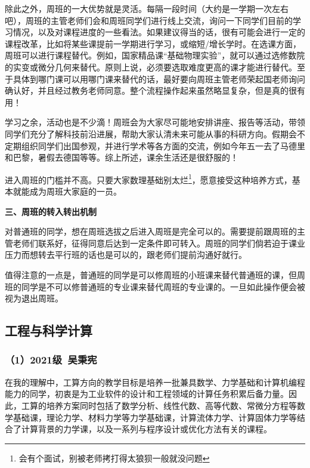 \documentclass[11pt,oneside]{book}
\begin{document}
\vspace{10pt}

除此之外，周班的一大优势就是灵活。每隔一段时间（大约是一学期一次左右吧），周班的主管老师们会和周班同学们进行线上交流，询问一下同学们目前的学习情况，以及对课程进度的一些看法。如果建议得当的话，很有可能会进行一定的课程改革，比如将某些课提前一学期进行学习，或缩短/增长学时。在选课方面，周班可以进行课程替代。例如，国家精品课“基础物理实验”，就可以通过选修数院的实变或微分几何来替代。原则上说，必须要选取难度更高的课才能进行替代。至于具体到哪门课可以用哪门课来替代的话，最好要向周班主管老师荣起国老师询问确认好，并且经过教务老师同意。整个流程操作起来虽然略显复杂，但是真的很有用！

\vspace{10pt}

学习之余，活动也是不少滴！周班会为大家尽可能地安排讲座、报告等活动，带领同学们充分了解科技前沿进展，帮助大家认清未来可能从事的科研方向。假期会不定期组织同学们出国参观，并进行学术等各方面的交流，例如今年五一去了马德里和巴黎，暑假去德国等等。综上所述，课余生活还是很舒服的！

\vspace{10pt}

进入周班的门槛并不高。只要大家数理基础别太烂\footnote{会有个面试，别被老师拷打得太狼狈一般就没问题}，愿意接受这种培养方式，基本就能成为周班大家庭的一员。

\vspace{10pt}

\textbf{\textbf{三、周班的转入转出机制}}

对普通班的同学，想在周班选拔之后进入周班是完全可以的。需要提前跟周班的主管老师们联系好，征得同意后达到一定条件即可转入。周班的同学们倘若迫于课业压力而想转去平行班的话也是可以的，跟老师们提前沟通好就行。

\vspace{10pt}

值得注意的一点是，普通班的同学是可以修周班的小班课来替代普通班的课，但周班的同学是不可以修普通班的专业课来替代周班的专业课的。一旦如此操作便会被视为退出周班。

\subsection{工程与科学计算}
\subsubsection{（1）2021级\ 吴秉宪}
            
在我的理解中，工算方向的教学目标是培养一批兼具数学、力学基础和计算机编程能力的同学，初衷是为工业软件的设计和工程领域的计算任务积累后备力量。因此，工算的培养方案同时包括了数学分析、线性代数、高等代数、常微分方程等数学基础课，理论力学、材料力学等力学基础课，计算流体力学、计算固体力学等结合了计算背景的力学课，以及一系列与程序设计或优化方法有关的课程。
\end{document}
